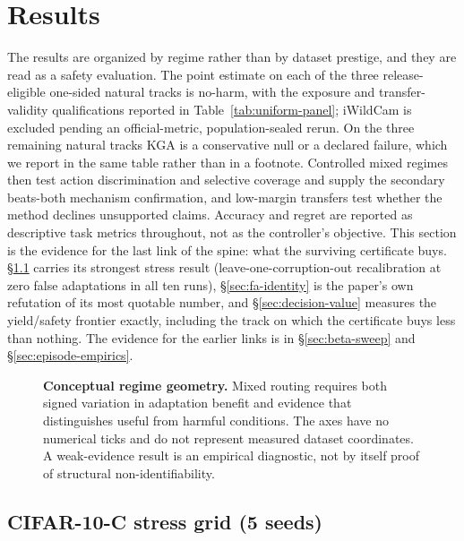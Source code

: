 \section{Results}\label{sec:exp}
The results are organized by regime rather than by dataset prestige, and they are read as a safety evaluation. The point estimate on each of the three release-eligible one-sided natural tracks is no-harm, with the exposure and transfer-validity qualifications reported in Table~\ref{tab:uniform-panel}; iWildCam is excluded pending an official-metric, population-sealed rerun. On the three remaining natural tracks KGA is a conservative null or a declared failure, which we report in the same table rather than in a footnote. Controlled mixed regimes then test action discrimination and selective coverage and supply the secondary beats-both mechanism confirmation, and low-margin transfers test whether the method declines unsupported claims. Accuracy and regret are reported as descriptive task metrics throughout, not as the controller's objective.
This section is the evidence for the last link of the spine: what the surviving certificate buys.
\S\ref{sec:cifar-stress} carries its strongest stress result (leave-one-corruption-out
recalibration at zero false adaptations in all ten runs), \S\ref{sec:fa-identity} is the paper's own
refutation of its most quotable number, and \S\ref{sec:decision-value} measures the yield/safety
frontier exactly, including the track on which the certificate buys less than nothing. The evidence
for the earlier links is in \S\ref{sec:beta-sweep} and \S\ref{sec:episode-empirics}.

\begin{figure}[t]
\centering
{}
\caption{\textbf{Conceptual regime geometry.} Mixed routing requires both signed variation in
adaptation benefit and evidence that distinguishes useful from harmful conditions. The axes have
no numerical ticks and do not represent measured dataset coordinates. A weak-evidence result is
an empirical diagnostic, not by itself proof of structural non-identifiability.}
\label{fig:regime-map}
\end{figure}

\subsection{CIFAR-10-C stress grid (5 seeds)}\label{sec:cifar-stress}

